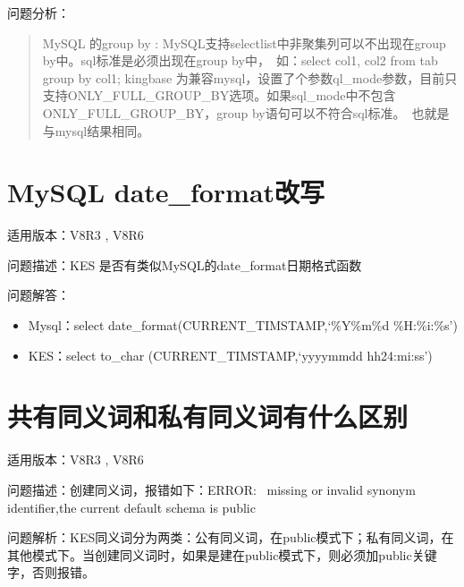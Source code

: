 \documentclass[letterpaper,10pt,english]{sphinxmanual}
\let\sphinxpxdimen\pdfpxdimen\else\newdimen\sphinxpxdimen
\begin{document}
问题分析：
\begin{quote}

MySQL 的group by : MySQL支持selectlist中非聚集列可以不出现在group by中。sql标准是必须出现在group by中， 如：select col1, col2 from tab group by col1; kingbase 为兼容mysql，设置了个参数ql\_mode参数，目前只支持ONLY\_FULL\_GROUP\_BY选项。如果sql\_mode中不包含ONLY\_FULL\_GROUP\_BY，group by语句可以不符合sql标准。 也就是与mysql结果相同。

\begin{figure}[htbp]
\centering

\noindent\sphinxincludegraphics[width=650\sphinxpxdimen,height=268\sphinxpxdimen]{{FAQ5663}.png}
\end{figure}
\end{quote}


\section{MySQL date\_format改写}
\label{\detokenize{sql:mysql-date-format}}
适用版本：V8R3 , V8R6

问题描述：KES 是否有类似MySQL的date\_format日期格式函数

问题解答：
\begin{itemize}
\item {} 
Mysql：select date\_format(CURRENT\_TIMSTAMP,‘\%Y\sphinxhyphen{}\%m\sphinxhyphen{}\%d \%H:\%i:\%s’)

\item {} 
KES：select to\_char (CURRENT\_TIMSTAMP,‘yyyy\sphinxhyphen{}mm\sphinxhyphen{}dd hh24:mi:ss’)

\end{itemize}


\section{共有同义词和私有同义词有什么区别}
\label{\detokenize{sql:id9}}
适用版本：V8R3 , V8R6

问题描述：创建同义词，报错如下：ERROR:  missing or invalid synonym identifier,the current default schema is public

问题解析：KES同义词分为两类：公有同义词，在public模式下；私有同义词，在其他模式下。当创建同义词时，如果是建在public模式下，则必须加public关键字，否则报错。
\end{document}
